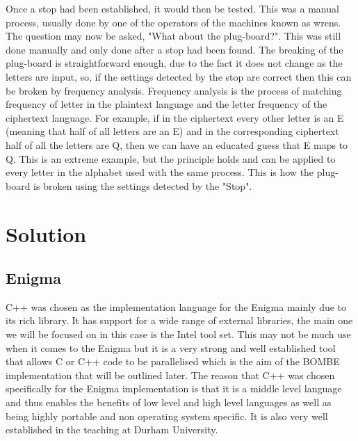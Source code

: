 \documentclass[12pt,a4paper]{article}
\begin{document}
Once a stop had been established, it would then be tested. This was a manual process, usually done by one of the operators of the machines known as wrens. The question may now be asked, "What about the plug-board?". This was still done manually and only done after a stop had been found. The breaking of the plug-board is straightforward enough, due to the fact it does not change as the letters are input, so, if the settings detected by the stop are correct then this can be broken by frequency analysis. Frequency analysis is the process of matching frequency of letter in the plaintext language and the letter frequency of the ciphertext language. For example, if in the ciphertext every other letter is an E (meaning that half of all letters are an E) and in the corresponding ciphertext half of all the letters are Q, then we can have an educated guess that E maps to Q. This is an extreme example, but the principle holds and can be applied to every letter in the alphabet used with the same process. This is how the plug-board is broken using the settings detected by the "Stop".

\section{Solution}

\subsection{Enigma}

C++ was chosen as the implementation language for the Enigma mainly due to its rich library. It has support for a wide range of external libraries, the main one we will be focused on in this case is the Intel tool set. This may not be much use when it comes to the Enigma but it is a very strong and well established tool that allows C or C++ code to be parallelised which is the aim of the BOMBE implementation that will be outlined later. The reason that C++ was chosen specifically for the Enigma implementation is that it is a middle level language and thus enables the benefits of low level and high level languages as well as being highly portable and non operating system specific. It is also very well established in the teaching at Durham University.\\
\end{document}
